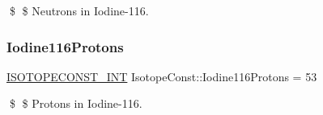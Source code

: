 \$ \$ Neutrons in Iodine-\/116. \mbox{\label{group___isotope_const-_iodine-_i116_gab10ae8715e0673a31b1abcc40fbc7862}} 
\subsubsection{\texorpdfstring{Iodine116\+Protons}{Iodine116Protons}}
{\footnotesize\ttfamily \mbox{\hyperlink{group___isotope_const-_macros_ga5f18360b3e99483a35c32d789e62621c}{I\+S\+O\+T\+O\+P\+E\+C\+O\+N\+S\+T\+\_\+\+I\+NT}} Isotope\+Const\+::\+Iodine116\+Protons = 53}

\$ \$ Protons in Iodine-\/116. 
